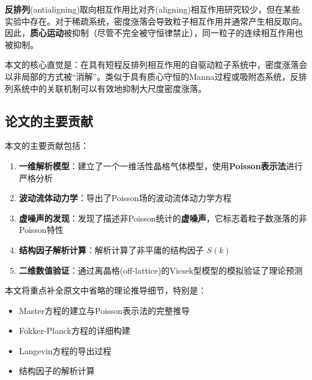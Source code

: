 \textbf{反排列}(antialigning)取向相互作用比对齐(aligning)相互作用研究较少，但在某些实验中存在\cite{boltz2025}。对于稀疏系统，密度涨落会导致粒子相互作用并通常产生相反取向。因此，\textbf{质心运动}被抑制（尽管不完全被守恒律禁止），同一粒子的连续相互作用也被抑制。

\begin{notebox}[核心直觉]
本文的核心直觉是：在具有短程反排列相互作用的自驱动粒子系统中，密度涨落会以非局部的方式被``消解''。类似于具有质心守恒的Manna过程或吸附态系统，反排列系统中的关联机制可以有效地抑制大尺度密度涨落。
\end{notebox}

\subsection{论文的主要贡献}

本文的主要贡献包括：

\begin{enumerate}
    \item \textbf{一维解析模型}：建立了一个一维活性晶格气体模型，使用\textbf{Poisson表示法}进行严格分析
    \item \textbf{波动流体动力学}：导出了Poisson场的波动流体动力学方程
    \item \textbf{虚噪声的发现}：发现了描述非Poisson统计的\textbf{虚噪声}，它标志着粒子数涨落的非Poisson特性
    \item \textbf{结构因子解析计算}：解析计算了非平庸的结构因子 $S(k)$
    \item \textbf{二维数值验证}：通过离晶格(off-lattice)的Vicsek型模型的模拟验证了理论预测
\end{enumerate}

本文将重点补全原文中省略的理论推导细节，特别是：
\begin{itemize}
    \item Master方程的建立与Poisson表示法的完整推导
    \item Fokker-Planck方程的详细构建
    \item Langevin方程的导出过程
    \item 结构因子的解析计算
\end{itemize}
